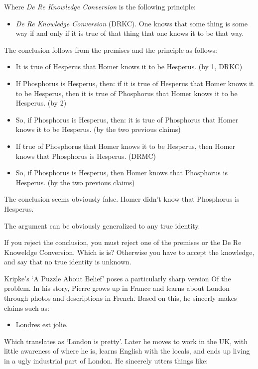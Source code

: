 \documentclass[../../../include/open-logic-chapter]{subfiles}
\begin{document}
Where \emph{De Re Knowledge Conversion} is the following principle:

\begin{itemize}
\item \emph{De Re Knowledge Conversion} (DRKC). One knows that some thing is some way if and
only if it is true of that thing that one knows it to be that way. 
\end{itemize}

The conclusion follows from the premises and the principle as follows:

\begin{itemize}
\item It is true of Hesperus that Homer knows it to be Hesperus. (by 1, DRKC)
\item If Phosphorus is Hesperus, then: if it is true of Hesperus that Homer knows it to be Hesperus, then it is true of Phosphorus that Homer knows it to be Hesperus. (by 2)
\item So, if Phosphorus is Hesperus, then: it is true of Phosphorus that Homer knows it to be Hesperus. (by the two previous claims)
\item If true of Phosphorus that Homer knows it to be Hesperus, then Homer knows that Phosphorus is Hesperus. (DRMC)
\item So, if Phosphorus is Hesperus, then Homer knows that Phosphorus is Hesperus. (by the two previous claims)
\end{itemize}

The conclusion seems obviously false. Homer didn't know that Phosphorus
is Hesperus.

The argument can be obviously generalized to any true identity.

If you reject the conclusion, you must reject one of the premises
or the De Re Knoweldge Conversion. Which is is? Otherwise you 
have to accept the knowledge, and say that no true identity is unknown.

Kripke's `A Puzzle About Belief' poses a particularly sharp version Of
the problem. In his story, Pierre grows up in France and learns about 
London through photos and descriptions in French. Based on this, 
he sincerly makes claims such as:

\begin{itemize}
\item Londres est jolie.
\end{itemize}

Which translates as `London is pretty'. Later he moves to work in 
the UK, with little awareness of where he is, learns English with
the locals, and ends up living in a ugly industrial part of London.
He sincerely utters things like:
\end{document}
